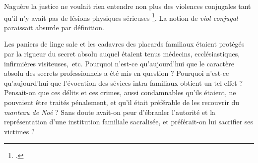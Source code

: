 Naguère la justice ne voulait rien entendre non plus des violences conjugales tant qu'il n'y avait pas de lésions physiques sérieuses
\footnote{.}. La notion de \emph{viol conjugal} paraissait absurde par définition.
 
 Les paniers de linge sale et les cadavres des placards familiaux étaient protégés par la rigueur du secret absolu auquel étaient tenus médecins, ecclésiastiques, infirmières visiteuses,~etc. Pourquoi n'est-ce qu'aujourd'hui que le caractère absolu des secrets professionnels a été mis en question ? Pourquoi n'est-ce qu'aujourd'hui que l'évocation des sévices intra familiaux obtient un tel effet ? Pensait-on que ces délits et ces crimes, aussi condamnables qu'ils étaient, ne pouvaient être traités pénalement, et qu'il était préférable de les recouvrir du \emph{manteau de Noé} ? Sans doute avait-on peur d'ébranler l'autorité et la représentation d'une institution familiale sacralisée, et préférait-on lui sacrifier ses victimes ? 
 
 



 
